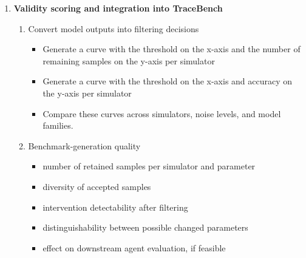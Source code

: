 \documentclass[11pt]{article}
\begin{document}
\begin{enumerate}[label=\arabic*.]
    \item \textbf{Validity scoring and integration into TraceBench}
    \begin{enumerate}[label=\arabic{enumi}.\arabic*.]
        \item Convert model outputs into filtering decisions
        \begin{itemize}
            \item Generate a curve with the threshold on the x-axis and the number of remaining samples on the y-axis per simulator
            \item Generate a curve with the threshold on the x-axis and accuracy on the y-axis per simulator
            \item Compare these curves across simulators, noise levels, and model families.
        \end{itemize}
        \item Benchmark-generation quality
        \begin{itemize}
            \item number of retained samples per simulator and parameter
            \item diversity of accepted samples
            \item intervention detectability after filtering
            \item distinguishability between possible changed parameters
            \item effect on downstream agent evaluation, if feasible
        \end{itemize}
    \end{enumerate}


\end{enumerate}
\end{document}
